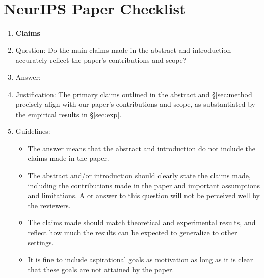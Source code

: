 \section*{NeurIPS Paper Checklist}

\begin{enumerate}

\item {\bf Claims}
    \item[] Question: Do the main claims made in the abstract and introduction accurately reflect the paper's contributions and scope?
    \item[] Answer: \answerYes{}
    \item[] Justification: The primary claims outlined in the abstract and \S\ref{sec:method} precisely align with our paper's contributions and scope, as substantiated by the empirical results in \S\ref{sec:exp}.
    \item[] Guidelines:
    \begin{itemize}
        \item The answer \answerNA{} means that the abstract and introduction do not include the claims made in the paper.
        \item The abstract and/or introduction should clearly state the claims made, including the contributions made in the paper and important assumptions and limitations. A \answerNo{} or \answerNA{} answer to this question will not be perceived well by the reviewers.
        \item The claims made should match theoretical and experimental results, and reflect how much the results can be expected to generalize to other settings.
        \item It is fine to include aspirational goals as motivation as long as it is clear that these goals are not attained by the paper.
    \end{itemize}


\end{enumerate}
